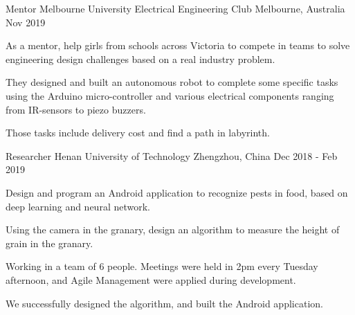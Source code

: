 

\begin{cventries}


  \cventry
    {Mentor} %
    {Melbourne University Electrical Engineering Club} %
    {Melbourne, Australia} %
    {Nov 2019} %
    {
      \begin{cvitems} %
        \item {As a mentor, help girls from schools across Victoria to compete in teams to solve engineering design challenges based on a real industry problem.}
        \item {They designed and built an autonomous robot to complete some specific tasks using the Arduino micro-controller and various electrical components ranging from IR-sensors to piezo buzzers.}
        \item {Those tasks include delivery cost and find a path in labyrinth.}
      \end{cvitems}
    }




  \cventry
    {Researcher} %
    {Henan University of Technology} %
    {Zhengzhou, China} %
    {Dec 2018 - Feb 2019} %
    {
      \begin{cvitems} %
        \item {Design and program an Android application to recognize pests in food, based on deep learning and neural network.}
        \item {Using the camera in the granary, design an algorithm to measure the height of grain in the granary.}
        \item {Working in a team of 6 people. Meetings were held in 2pm every Tuesday afternoon, and Agile Management were applied during development.}
        \item {We successfully designed the algorithm, and built the Android application.}
      \end{cvitems}
    }


\end{cventries}
